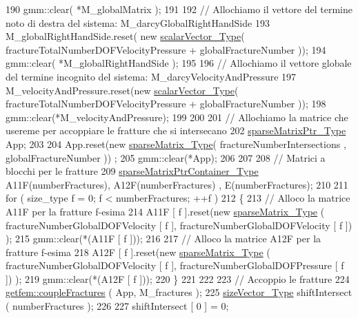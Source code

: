 \begin{DoxyCode}
190     gmm::clear( *M\_globalMatrix );
191     
192     \textcolor{comment}{// Allochiamo il vettore del termine noto di destra del sistema: M\_darcyGlobalRightHandSide}
193     M\_globalRightHandSide.reset( \textcolor{keyword}{new} \hyperlink{Core_8h_a4e75b5863535ba1dd79942de2846eff0}{scalarVector\_Type}( 
      fractureTotalNumberDOFVelocityPressure + globalFractureNumber ));
194     gmm::clear( *M\_globalRightHandSide );
195 
196     \textcolor{comment}{// Allochiamo il vettore globale del termine incognito del sistema: M\_darcyVelocityAndPressure}
197     M\_velocityAndPressure.reset(\textcolor{keyword}{new} \hyperlink{Core_8h_a4e75b5863535ba1dd79942de2846eff0}{scalarVector\_Type}( 
      fractureTotalNumberDOFVelocityPressure + globalFractureNumber ));
198     gmm::clear(*M\_velocityAndPressure);
199 
200     
201     \textcolor{comment}{// Allochiamo la matrice che usereme per accoppiare le fratture che si intersecano}
202     \hyperlink{Core_8h_a87137a9501b38c724ac80bc955164bb7}{sparseMatrixPtr\_Type}  App;
203 
204     App.reset(\textcolor{keyword}{new} \hyperlink{Core_8h_afba9f623673e2ae32054015bdb5500f9}{sparseMatrix\_Type}( fractureNumberIntersections , globalFractureNumber ))
      ;
205     gmm::clear(*App);
206 
207     
208     \textcolor{comment}{// Matrici a blocchi per le fratture}
209     \hyperlink{Core_8h_a2f5e086fbce840d40be38c016488fd91}{sparseMatrixPtrContainer\_Type} A11F(numberFractures), A12F(numberFractures)
      , E(numberFractures);
210 
211     \textcolor{keywordflow}{for} ( size\_type f = 0; f < numberFractures; ++f )
212     \{
213         \textcolor{comment}{// Alloco la matrice A11F per la fratture f-esima}
214         A11F [ f ].reset(\textcolor{keyword}{new} \hyperlink{Core_8h_afba9f623673e2ae32054015bdb5500f9}{sparseMatrix\_Type} ( fractureNumberGlobalDOFVelocity [ f ], 
      fractureNumberGlobalDOFVelocity [ f ]) );
215         gmm::clear(*(A11F [ f ]));
216 
217         \textcolor{comment}{// Alloco la matrice A12F per la fratture f-esima}
218         A12F [ f ].reset(\textcolor{keyword}{new} \hyperlink{Core_8h_afba9f623673e2ae32054015bdb5500f9}{sparseMatrix\_Type} ( fractureNumberGlobalDOFVelocity [ f ], 
      fractureNumberGlobalDOFPressure [ f ]) );
219         gmm::clear(*(A12F [ f ]));
220     \}
221 
222     
223     \textcolor{comment}{// Accoppio le fratture}
224     \hyperlink{namespacegetfem_a9a0b9f7498668cda8b547b10ac914a34}{getfem::coupleFractures} ( App, M\_fractures );
225     \hyperlink{Core_8h_a83c51913d041a5001e8683434c09857f}{sizeVector\_Type} shiftIntersect ( numberFractures );
226     
227     shiftIntersect [ 0 ] = 0;

\end{DoxyCode}
